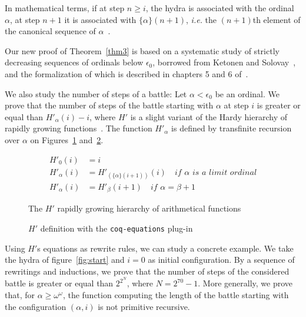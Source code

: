 \documentclass{easychair}
\makeatletter
\newcommand{\inputsnippets}[1]
  {{\setlength{\itemsep}{1pt}\setlength{\parsep}{0pt}%
    \alectryon@copymacros\begin{io}
      \forcsvlist{\item\@inputsnippet}{#1}
    \end{io}}}
\let@old Save definition of 
\newcommand{\@inputsnippet}[1]
  {{\renewenvironment{alectryon}{}{}%
    @old{snippets/#1}}}
\newcommand{\canonseq}[2]{\mbox{$\{#1\}(#2)$}}
\makeatother
\begin{document}
 In mathematical terms, if at step $n\geq i$, the hydra is associated with the ordinal $\alpha$, at step $n+1$ it is associated with
 $\canonseq{\alpha}{n+1}$, \emph{i.e.} the $(n+1)$th element of the canonical sequence of $\alpha$~\cite{KS81}.

 Our new proof of Theorem~\ref{thm3} is based on a systematic study of strictly decreasing sequences of ordinals below $\epsilon_0$, borrowed from Ketonen and Solovay~\cite{KS81}, and the formalization of which is described  in chapters 5 and 6 of~\cite{HydraBook}.
 
We also study the number of steps of a battle:
Let $\alpha<\epsilon_0$ be an ordinal. 
We prove that  the number of steps of the battle starting with
$\alpha$ at step $i$ is greater or equal than
$H'_\alpha(i)-i$, where $H'$ is a slight variant of the Hardy hierarchy of rapidly growing functions~\cite{BW85, KS81, Promel2013, Wainer1970}.  The function $H'_\alpha$ is defined by transfinite recursion over $\alpha$ on Figures~\ref{fig:hardy-math}
and~\ref{fig:Hprime}.


\begin{figure}[h]
\begin{align}
  H'_0(i) & = i\\
  H'_\alpha(i) &= H'_{(\canonseq{\alpha}{i+1})}(i)  \quad\textit{if $\alpha$ is a limit ordinal}\\
  H'_{\alpha}(i) &=H'_\beta(i+1) \quad\textit{if $\alpha=\beta+1$}
\end{align}  
  \caption{The $H'$ rapidly growing hierarchy of arithmetical functions}
  \label{fig:hardy-math}
\end{figure}


\begin{figure}[h]
  \centering
  \fbox{
    \begin{minipage}[h]{1.0\linewidth}
 \inputsnippets{Hprime/HprimeDef}     
    \end{minipage}}
 \caption{$H'$ definition with the \texttt{coq-equations}
 plug-in~\cite{sozeau:hal-01671777}}
\label{fig:Hprime}
\end{figure}


Using $H'$s equations as rewrite rules, we can study a concrete example. We take the hydra of figure~\ref{fig:start} and $i=0$ as initial configuration. 
By a sequence of rewritings and inductions, we prove that the number of steps of the considered battle is greater or equal than $2^{2^N}$, where $N=2^{70}-1$.
More generally, we prove that, for $\alpha\geq\omega^\omega$, 
the function computing the length of the battle starting with the configuration $(\alpha,i)$ is not primitive recursive.
\end{document}
